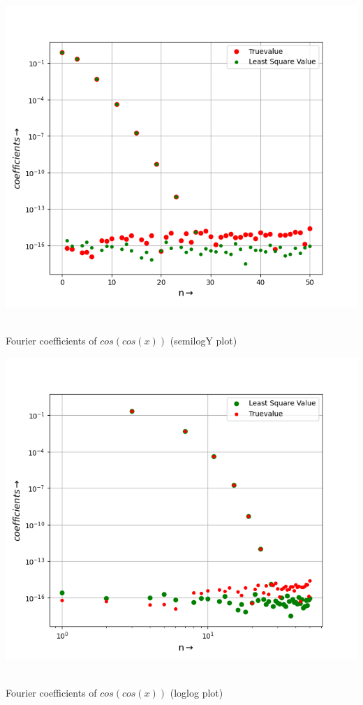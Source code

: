 \documentclass[12pt, a4paper]{report}
\begin{document}
\begin{center}
	\includegraphics[scale=0.65]{Figure_9} 
	\caption{\\Fourier coefficients of $cos(cos(x))$ (semilogY plot)}
	\label{fig:rawdata}
\end{center}
\begin{center}
	\includegraphics[scale=0.65]{Figure_10} 
	\caption{\\Fourier coefficients of $cos(cos(x))$ (loglog plot)}
	\label{fig:rawdata}
\end{center}
\end{document}
